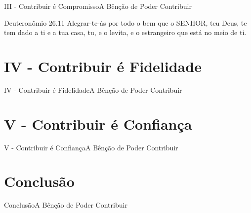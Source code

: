 \documentclass[14pt,aspectratio=169]{beamer}
\newcommand{\TT}{A Bênção de Poder Contribuir}
\newcommand{\PIII}{III - Contribuir é Compromisso}
\newcommand{\PIV}{IV - Contribuir é Fidelidade}
\newcommand{\PV}{V - Contribuir é Confiança}
\newcommand{\CO}{Conclusão}
\begin{document}
\begin{frame}{\PIII}{\TT}
 \begin{block}{Deuteronômio 26.11}
Alegrar-te-ás por todo o bem que o SENHOR, teu Deus, te tem dado a ti e a tua casa, tu, e o levita, e o estrangeiro que está no meio de ti.
 \end{block}
\end{frame}

\section{\PIV}
\begin{frame}{\PIV}{\TT}

\end{frame}

\section{\PV}
\begin{frame}{\PV}{\TT}

\end{frame}

\section{\CO}
\begin{frame}{\CO}{\TT}

\end{frame}
\end{document}
